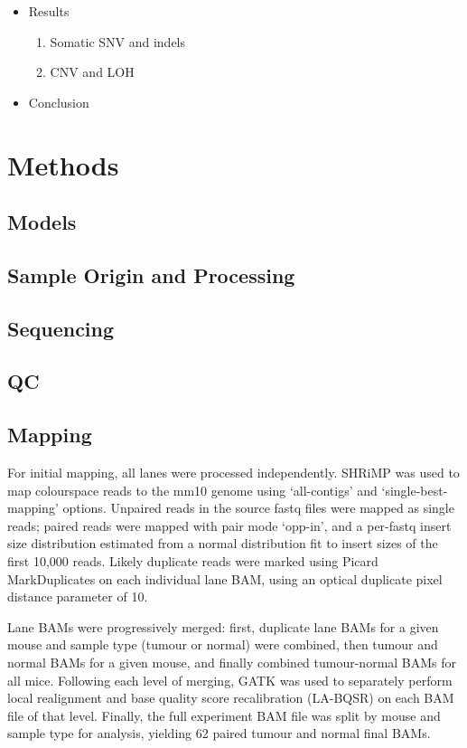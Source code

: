 \documentclass[thesis.tex]{subfiles}
\begin{document}
\begin{itemize}
  \item Results
  \begin{enumerate}
    \item Somatic SNV and indels
    \item CNV and LOH
  \end{enumerate}

  \item Conclusion
  
\end{itemize}

\section{Methods}

\subsection{Models}

\subsection{Sample Origin and Processing}

\subsection{Sequencing}

\subsection{QC}

\subsection{Mapping}

For initial mapping, all lanes were processed independently.  SHRiMP was used to map colourspace reads to the mm10 genome using `all-contigs' and `single-best-mapping' options.  Unpaired reads in the source fastq files were mapped as single reads; paired reads were mapped with pair mode `opp-in', and a per-fastq insert size distribution estimated from a normal distribution fit to insert sizes of the first 10,000 reads.  Likely duplicate reads were marked using Picard MarkDuplicates on each individual lane BAM, using an optical duplicate pixel distance parameter of 10.

Lane BAMs were progressively merged: first, duplicate lane BAMs for a given mouse and sample type (tumour or normal) were combined, then tumour and normal BAMs for a given mouse, and finally combined tumour-normal BAMs for all mice.  Following each level of merging, GATK was used to separately perform local realignment and base quality score recalibration (LA-BQSR) on each BAM file of that level.  Finally, the full experiment BAM file was split by mouse and sample type for analysis, yielding 62 paired tumour and normal final BAMs.
\end{document}
